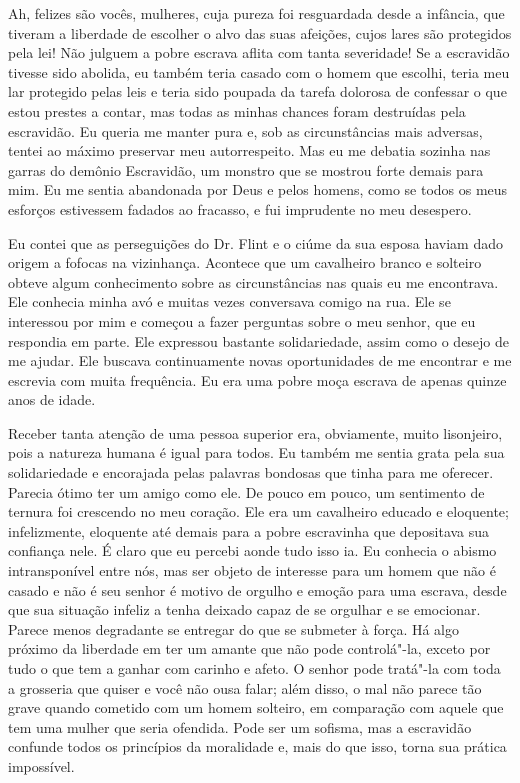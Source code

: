Ah, felizes são vocês, mulheres, cuja
pureza foi resguardada desde a infância, que tiveram a liberdade de
escolher o alvo das suas afeições, cujos lares são protegidos pela lei!
Não julguem a pobre escrava aflita com tanta severidade! Se a escravidão
tivesse sido abolida, eu também teria casado com o homem que escolhi,
teria meu lar protegido pelas leis e teria sido poupada da tarefa
dolorosa de confessar o que estou prestes a contar, mas todas as minhas
chances foram destruídas pela escravidão. Eu queria me manter pura e,
sob as circunstâncias mais adversas, tentei ao máximo preservar meu
autorrespeito. Mas eu me debatia sozinha nas garras do demônio
Escravidão, um monstro que se mostrou forte demais para mim. Eu me
sentia abandonada por Deus e pelos homens, como se todos os meus
esforços estivessem fadados ao fracasso, e fui imprudente no meu
desespero.

Eu contei que as perseguições do Dr.
Flint e o ciúme da sua esposa haviam dado origem a fofocas na
vizinhança. Acontece que um cavalheiro branco e solteiro obteve algum
conhecimento sobre as circunstâncias nas quais eu me encontrava. Ele
conhecia minha avó e muitas vezes conversava comigo na rua. Ele se
interessou por mim e começou a fazer perguntas sobre o meu senhor, que
eu respondia em parte. Ele expressou bastante solidariedade, assim como
o desejo de me ajudar. Ele buscava continuamente novas oportunidades de
me encontrar e me escrevia com muita frequência. Eu era uma pobre moça
escrava de apenas quinze anos de idade.

Receber tanta atenção de uma pessoa
superior era, obviamente, muito lisonjeiro, pois a natureza humana é
igual para todos. Eu também me sentia grata pela sua solidariedade e
encorajada pelas palavras bondosas que tinha para me oferecer. Parecia
ótimo ter um amigo como ele. De pouco em pouco, um sentimento de ternura
foi crescendo no meu coração. Ele era um cavalheiro educado e eloquente;
infelizmente, eloquente até demais para a pobre escravinha que
depositava sua confiança nele. É claro que eu percebi aonde tudo isso
ia. Eu conhecia o abismo intransponível entre nós, mas ser objeto de
interesse para um homem que não é casado e não é seu senhor é motivo de
orgulho e emoção para uma escrava, desde que sua situação infeliz a
tenha deixado capaz de se orgulhar e se emocionar. Parece menos
degradante se entregar do que se submeter à força. Há algo próximo da
liberdade em ter um amante que não pode controlá"-la, exceto por tudo o
que tem a ganhar com carinho e afeto. O senhor pode tratá"-la com toda a
grosseria que quiser e você não ousa falar; além disso, o mal não parece
tão grave quando cometido com um homem solteiro, em comparação com
aquele que tem uma mulher que seria ofendida. Pode ser um sofisma, mas a
escravidão confunde todos os princípios da moralidade e, mais do que
isso, torna sua prática impossível.

